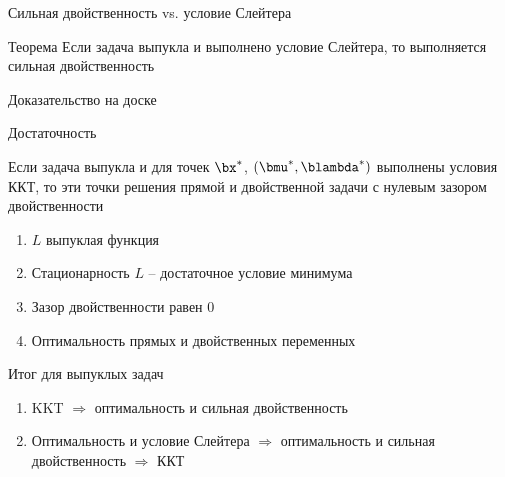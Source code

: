 \documentclass[12pt]{beamer}
\begin{document}
\begin{frame}{Сильная двойственность vs. условие Слейтера}
\begin{block}{Теорема}
Если задача выпукла и выполнено условие Слейтера, то выполняется сильная двойственность
\end{block}

Доказательство на доске
\end{frame}

\begin{frame}{Достаточность}

\begin{block}{}
Если задача выпукла и для точек $\bx^*$,  $(\bmu^*, \blambda^*)$ выполнены условия ККТ, то эти точки решения прямой и двойственной задачи с нулевым зазором двойственности
\end{block}

\begin{enumerate}
\item $L$ выпуклая функция
\item Стационарность $L$ -- достаточное условие минимума
\item Зазор двойственности равен 0
\item Оптимальность прямых и двойственных переменных
\end{enumerate}

\begin{block}{Итог для выпуклых задач}
\begin{enumerate}
\item KKT $\Rightarrow$ оптимальность и сильная двойственность
\item Оптимальность и условие Слейтера $\Rightarrow$ оптимальность и сильная двойственность $\Rightarrow$ ККТ
\end{enumerate}
\end{block}

\end{frame}
\end{document}
